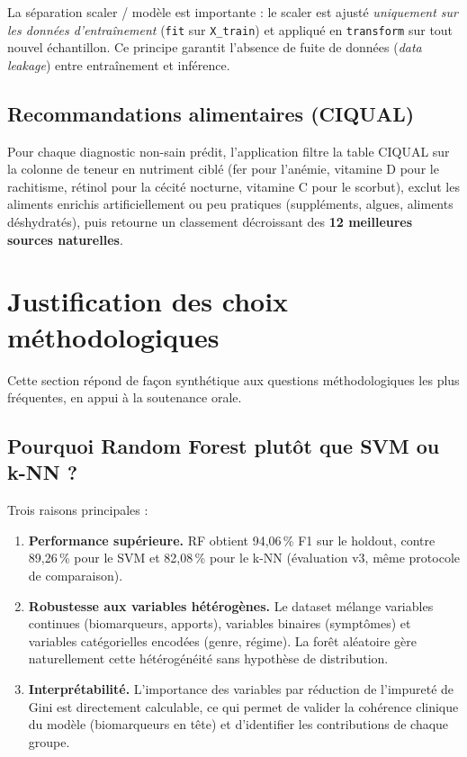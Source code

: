 \documentclass[12pt,a4paper]{article}
\begin{document}
La séparation scaler / modèle est importante : le scaler est ajusté
\emph{uniquement sur les données d'entraînement} (\texttt{fit} sur
\texttt{X\_train}) et appliqué en \texttt{transform} sur tout nouvel
échantillon. Ce principe garantit l'absence de fuite de données (\emph{data
leakage}) entre entraînement et inférence.

\subsection{Recommandations alimentaires (CIQUAL)}

Pour chaque diagnostic non-sain prédit, l'application filtre la table CIQUAL
sur la colonne de teneur en nutriment ciblé (fer pour l'anémie, vitamine D pour
le rachitisme, rétinol pour la cécité nocturne, vitamine C pour le scorbut),
exclut les aliments enrichis artificiellement ou peu pratiques
(suppléments, algues, aliments déshydratés), puis retourne un classement décroissant
des \textbf{12 meilleures sources naturelles}.

\section{Justification des choix méthodologiques}

Cette section répond de façon synthétique aux questions méthodologiques les plus
fréquentes, en appui à la soutenance orale.

\subsection{Pourquoi Random Forest plutôt que SVM ou k-NN ?}

Trois raisons principales :
\begin{enumerate}[leftmargin=2em]
    \item \textbf{Performance supérieure.} RF obtient 94,06\,\% F1 sur le holdout,
        contre 89,26\,\% pour le SVM et 82,08\,\% pour le k-NN (évaluation v3,
        même protocole de comparaison).
    \item \textbf{Robustesse aux variables hétérogènes.} Le dataset mélange variables
        continues (biomarqueurs, apports), variables binaires (symptômes) et variables
        catégorielles encodées (genre, régime). La forêt aléatoire gère naturellement
        cette hétérogénéité sans hypothèse de distribution.
    \item \textbf{Interprétabilité.} L'importance des variables par réduction de
        l'impureté de Gini est directement calculable, ce qui permet de valider
        la cohérence clinique du modèle (biomarqueurs en tête) et d'identifier les
        contributions de chaque groupe.
\end{enumerate}
\end{document}
